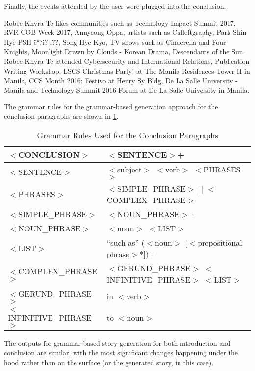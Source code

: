 Finally, the events attended by the user were plugged into the conclusion.
\begin{center} Robee Khyra Te likes communities such as Technology Impact Summit 2017, RVR COB Week 2017, Annyeong Oppa, artists  such as Calleftgraphy, Park Shin Hye-PSH ë°?ì? í??, Song Hye Kyo, TV shows  such as Cinderella and Four Knights, Moonlight Drawn by Clouds - Korean Drama, Descendants of the Sun. \newline 
Robee Khyra Te attended Cybersecurity and International Relations, Publication Writing Workshop, LSCS Christmas Party! at The Manila Residences Tower II in Manila, CCS Month 2016: Festivo at Henry Sy Bldg, De La Salle University - Manila and Technology Summit 2016 Forum at De La Salle University in Manila. 
 \end{center}
 The grammar rules for the grammar-based generation approach for the conclusion paragraphs are shown in \ref{tab:GrammarRules-Conclusion}.
 \clearpage
\begin{table}[ph!]   %
	\centering
	\caption{Grammar Rules Used for the Conclusion Paragraphs} \vspace{0.25em}
	\begin{tabular}{|p{2in}|p{2.5in}|} \hline
		$<$CONCLUSION$>$ & $<$SENTENCE$>$+ \\ \hline
		$<$SENTENCE$>$ & $<$subject$>$ $<$verb$>$ $<$PHRASES$>$ \\ \hline
		$<$PHRASES$>$ & $<$SIMPLE\_PHRASE$>$ $|$$|$ \newline $<$COMPLEX\_PHRASE$>$ \\ \hline
		$<$SIMPLE\_PHRASE$>$ & $<$NOUN\_PHRASE$>$+ \\ \hline
		$<$NOUN\_PHRASE$>$ & $<$noun$>$ $<$LIST$>$ \\ \hline
		$<$LIST$>$ & ``such as” ($<$noun$>$ [$<$prepositional phrase$>$*])+ \\ \hline
		$<$COMPLEX\_PHRASE$>$ & $<$GERUND\_PHRASE$>$ $<$INFINITIVE\_PHRASE$>$ $<$LIST$>$ \\ \hline
		$<$GERUND\_PHRASE$>$ & in $<$verb$>$ \\ \hline
		$<$INFINITIVE\_PHRASE$>$ & to $<$noun$>$ \\ \hline
	\end{tabular}
	\label{tab:GrammarRules-Conclusion}
\end{table}

The outputs for grammar-based story generation for both introduction and conclusion are similar, with the most significant changes happening under the hood rather than on the surface (or the generated story, in this case).


